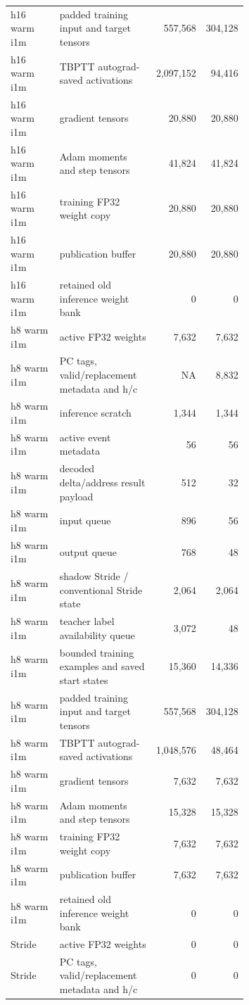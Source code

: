 \documentclass[10pt]{article}
\begin{document}
\begin{center}
\begin{longtable}{p{0.24\linewidth}p{0.43\linewidth}rr}
h16 warm i1m & padded training input and target tensors & 557,568 & 304,128 \\
h16 warm i1m & TBPTT autograd-saved activations & 2,097,152 & 94,416 \\
h16 warm i1m & gradient tensors & 20,880 & 20,880 \\
h16 warm i1m & Adam moments and step tensors & 41,824 & 41,824 \\
h16 warm i1m & training FP32 weight copy & 20,880 & 20,880 \\
h16 warm i1m & publication buffer & 20,880 & 20,880 \\
h16 warm i1m & retained old inference weight bank & 0 & 0 \\
h8 warm i1m & active FP32 weights & 7,632 & 7,632 \\
h8 warm i1m & PC tags, valid/replacement metadata and h/c & NA & 8,832 \\
h8 warm i1m & inference scratch & 1,344 & 1,344 \\
h8 warm i1m & active event metadata & 56 & 56 \\
h8 warm i1m & decoded delta/address result payload & 512 & 32 \\
h8 warm i1m & input queue & 896 & 56 \\
h8 warm i1m & output queue & 768 & 48 \\
h8 warm i1m & shadow Stride / conventional Stride state & 2,064 & 2,064 \\
h8 warm i1m & teacher label availability queue & 3,072 & 48 \\
h8 warm i1m & bounded training examples and saved start states & 15,360 & 14,336 \\
h8 warm i1m & padded training input and target tensors & 557,568 & 304,128 \\
h8 warm i1m & TBPTT autograd-saved activations & 1,048,576 & 48,464 \\
h8 warm i1m & gradient tensors & 7,632 & 7,632 \\
h8 warm i1m & Adam moments and step tensors & 15,328 & 15,328 \\
h8 warm i1m & training FP32 weight copy & 7,632 & 7,632 \\
h8 warm i1m & publication buffer & 7,632 & 7,632 \\
h8 warm i1m & retained old inference weight bank & 0 & 0 \\
Stride & active FP32 weights & 0 & 0 \\
Stride & PC tags, valid/replacement metadata and h/c & 0 & 0 \\

\end{longtable}
\end{center}
\end{document}
